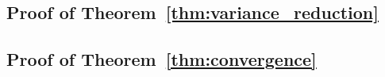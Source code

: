 \subsection{Proof of Theorem~\ref{thm:variance_reduction}}

\subsection{Proof of Theorem~\ref{thm:convergence}}
\label{app:convergence}

